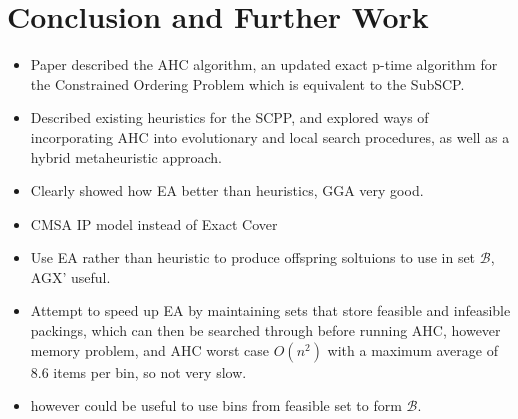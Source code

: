 \documentclass[authoryear]{elsarticle}
\begin{document}
\section{Conclusion and Further Work}
\label{sec:conclusion}
{\color{myPurple}
\begin{itemize}[leftmargin=*]
	\item Paper described the AHC algorithm, an updated exact p-time algorithm for the Constrained Ordering Problem which is equivalent to the SubSCP. 
	\item Described existing heuristics for the SCPP, and explored ways of incorporating AHC into evolutionary and local search procedures, as well as a hybrid metaheuristic approach.
	\item Clearly showed how EA better than heuristics, GGA very good.
	\item CMSA IP model instead of Exact Cover
	\item Use EA rather than heuristic to produce offspring soltuions to use in set $\mathcal{B}$, AGX' useful.
	\item Attempt to speed up EA by maintaining sets that store feasible and infeasible packings, which can then be searched through before running AHC, however memory problem, and AHC worst case $O(n^2)$ with a maximum average of 8.6 items per bin, so not very slow.
	\item however could be useful to use bins from feasible set to form $\mathcal{B}$. 
\end{itemize}
}
\end{document}
